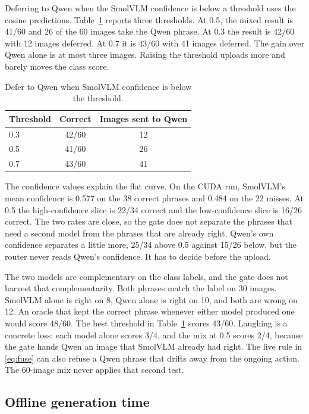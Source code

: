Deferring to Qwen when the SmolVLM confidence is below a threshold uses the
cosine predictions. Table~\ref{tab:route} reports three thresholds. At 0.5,
the mixed result is 41/60 and 26 of the 60 images take the Qwen phrase. At
0.3 the result is 42/60 with 12 images deferred. At 0.7 it is 43/60 with 41
images deferred. The gain over Qwen alone is at most three images. Raising
the threshold uploads more and barely moves the class score.

\begin{table}[t]
\caption{Defer to Qwen when SmolVLM confidence is below the threshold.}
\label{tab:route}
\centering
\begin{tabular}{lcc}
\toprule
Threshold & Correct & Images sent to Qwen \\
\midrule
0.3 & 42/60 & 12 \\
0.5 & 41/60 & 26 \\
0.7 & 43/60 & 41 \\
\bottomrule
\end{tabular}
\end{table}

The confidence values explain the flat curve. On the CUDA run, SmolVLM's
mean confidence is 0.577 on the 38 correct phrases and 0.484 on the 22
misses. At 0.5 the high-confidence slice is 22/34 correct and the
low-confidence slice is 16/26 correct. The two rates are close, so the
gate does not separate the phrases that need a second model from the
phrases that are already right. Qwen's own confidence separates a little
more, 25/34 above 0.5 against 15/26 below, but the router never reads
Qwen's confidence. It has to decide before the upload.

The two models are complementary on the class labels, and the gate does
not harvest that complementarity. Both phrases match the label on 30
images. SmolVLM alone is right on 8, Qwen alone is right on 10, and both
are wrong on 12. An oracle that kept the correct phrase whenever either
model produced one would score 48/60. The best threshold in
Table~\ref{tab:route} scores 43/60. Laughing is a concrete loss: each model
alone scores 3/4, and the mix at 0.5 scores 2/4, because the gate hands
Qwen an image that SmolVLM already had right. The live rule in
\eqref{eq:fuse} can also refuse a Qwen phrase that drifts away from the
ongoing action. The 60-image mix never applies that second test.

\subsection{Offline generation time}

